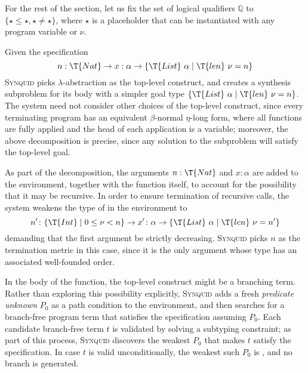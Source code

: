 \documentclass[10pt,preprint]{sigplanconf-pldi16}
\theoremstyle{definition}
\newcommand{\quals}{\mathbb{Q}}
\newcommand{\lang}{\textsc{Synquid}\xspace}
\newcommand{\tool}{\textsc{Synquid}\xspace}
\begin{document}
For the rest of the section, let us fix the set of logical qualifiers $\quals$ to $\{\star\leq \star,\star\neq \star\}$, 
where $\star$ is a placeholder that can be instantiated with any program variable or $\nu$.

Given the specification 
$$
n:\T{Nat} \to x:\alpha \to \{\T{List}\ \alpha\mid \T{len}\ \nu = n\}
$$
\tool picks $\lambda$-abstraction as the top-level construct,
and creates a synthesis subproblem for its body with a simpler goal type $\{\T{List}\ \alpha\mid \T{len}\ \nu = n\}$.
The system need not consider other choices of the top-level construct,
since every terminating program has an equivalent $\beta$-normal $\eta$-long form,
where all functions are fully applied and the head of each application is a variable;
moreover, the above decomposition is precise, since any solution to the subproblem will satisfy the top-level goal.

As part of the decomposition, the arguments $n:\T{Nat}$ and $x:\alpha$ are added to the environment, 
together with the function  itself, to account for the possibility that it may be recursive. 
In order to ensure termination of recursive calls,
the system weakens the type of  in the environment to
$$
n'\colon\{\T{Int}\mid 0 \leq \nu < n\} \to x'\colon\alpha\to \{\T{List}\ \alpha\mid \T{len}\ \nu = n'\}
$$
demanding that the first argument be strictly decreasing.
\lang picks $n$ as the termination metric in this case,
since it is the only argument whose type has an associated well-founded order. 

In the body of the function, 
the top-level construct might be a branching term.
Rather than exploring this possibility explicitly,
\tool adds a fresh \emph{predicate unknown} $P_0$ as a path condition to the environment,
and then searches for a branch-free program term that satisfies the specification assuming $P_0$.
Each candidate branch-free term $t$ is validated by solving a subtyping constraint;
as part of this process, \tool discovers the weakest $P_0$ that makes $t$ satisfy the specification.
In case $t$ is valid unconditionally, the weakest such $P_0$ is , and no branch is generated.
\end{document}
